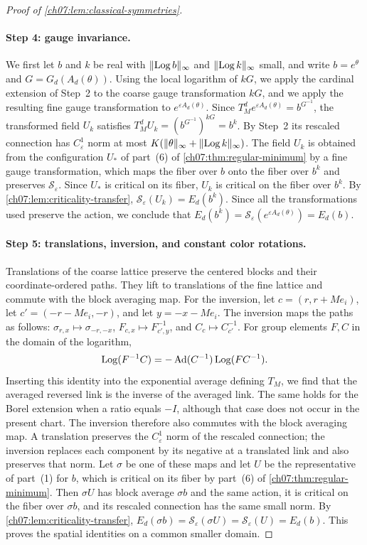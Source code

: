 \begin{proof}[Proof of \cref{ch07:lem:classical-symmetries}]
\paragraph{Step 4: gauge invariance.}
We first let $b$ and $k$ be real with $\lVert \operatorname{Log} b\rVert_\infty$ and $\lVert \operatorname{Log} k\rVert_\infty$ small, and write $b=e^\theta$ and $G=G_d(A_d(\theta))$. Using the local logarithm of $kG$, we apply the cardinal extension of Step~2 to the coarse gauge transformation $kG$, and we apply the resulting fine gauge transformation to $e^{\varepsilon A_d(\theta)}$. Since $T_M^de^{\varepsilon A_d(\theta)}=b^{G^{-1}}$, the transformed field $U_k$ satisfies $T_M^dU_k=(b^{G^{-1}})^{kG}=b^k$. By Step~2 its rescaled connection has $C^1_\varepsilon$ norm at most $K(\lVert \theta\rVert_\infty+\lVert \operatorname{Log} k\rVert_\infty)$. The field $U_k$ is obtained from the configuration $U_*$ of part~(6) of \cref{ch07:thm:regular-minimum} by a fine gauge transformation, which maps the fiber over $b$ onto the fiber over $b^k$ and preserves $\mathscr S_\varepsilon$. Since $U_*$ is critical on its fiber, $U_k$ is critical on the fiber over $b^k$. By \cref{ch07:lem:criticality-transfer}, $\mathscr S_\varepsilon(U_k)=E_d(b^k)$. Since all the transformations used preserve the action, we conclude that $E_d(b^k)=\mathscr S_\varepsilon(e^{\varepsilon A_d(\theta)})=E_d(b)$.

\paragraph{Step 5: translations, inversion, and constant color rotations.}
Translations of the coarse lattice preserve the centered blocks and their coordinate-ordered paths. They lift to translations of the fine lattice and commute with the block averaging map. For the inversion, let $c=(r,r+Me_i)$, let $c'=(-r-Me_i,-r)$, and let $y=-x-Me_i$. The inversion maps the paths as follows: $\sigma_{r,x}\mapsto\sigma_{-r,-x}$, $F_{c,x}\mapsto F_{c',y}^{-1}$, and $C_c\mapsto C_{c'}^{-1}$. For group elements $F,C$ in the domain of the logarithm,
\[
 \operatorname{Log}(F^{-1}C)=-\operatorname{Ad}(C^{-1})\operatorname{Log}(FC^{-1}).
\]
Inserting this identity into the exponential average defining $T_M$, we find that the averaged reversed link is the inverse of the averaged link. The same holds for the Borel extension when a ratio equals $-I$, although that case does not occur in the present chart. The inversion therefore also commutes with the block averaging map. A translation preserves the $C^1_\varepsilon$ norm of the rescaled connection; the inversion replaces each component by its negative at a translated link and also preserves that norm. Let $\sigma$ be one of these maps and let $U$ be the representative of part~(1) for $b$, which is critical on its fiber by part~(6) of \cref{ch07:thm:regular-minimum}. Then $\sigma U$ has block average $\sigma b$ and the same action, it is critical on the fiber over $\sigma b$, and its rescaled connection has the same small norm. By \cref{ch07:lem:criticality-transfer}, $E_d(\sigma b)=\mathscr S_\varepsilon(\sigma U)=\mathscr S_\varepsilon(U)=E_d(b)$. This proves the spatial identities on a common smaller domain.


\end{proof}
